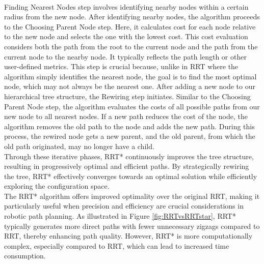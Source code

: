 \documentclass{ctuthesis}
\begin{document}
\\
Finding Nearest Nodes step involves identifying nearby nodes 
within a certain radius from the new node. 
After identifying nearby nodes, the algorithm proceeds to the Choosing Parent Node step. 
Here, it calculates cost for each node 
relative to the new node and selects the one with the lowest cost. 
This cost evaluation considers both the path from the root to the current node and 
the path from the current node to the nearby node. 
It typically reflects the path length or other user-defined metrics. 
This step is crucial because, 
unlike in RRT where the algorithm simply identifies the nearest node, 
the goal is to find the most optimal node,
which may not always be the nearest one. 
After adding a new node to our hierarchical tree structure, 
the Rewiring step initiates. 
Similar to the Choosing Parent Node step, 
the algorithm evaluates the costs of all possible paths from our new node to all nearest nodes. 
If a new path reduces the cost of the node, the algorithm removes the old path to the node
and adds the new path.
During this process, the rewired node gets a new parent, 
and the old parent, from which the old path originated, may no longer have a child.\\[12pt]
Through these iterative phases, RRT* continuously improves the tree structure, 
resulting in progressively optimal and efficient paths. 
By strategically rewiring the tree, 
RRT* effectively converges towards an optimal solution while 
efficiently exploring the configuration space.\\[12pt]
The RRT* algorithm offers improved optimality over the original RRT, 
making it particularly useful when precision and efficiency are crucial 
considerations in robotic path planning.
As illustrated in Figure \ref{fig:RRTvsRRTstar}, 
RRT* typically generates more direct paths with fewer unnecessary zigzags compared to RRT, 
thereby enhancing path quality.
However, RRT* is more computationally complex, especially compared to RRT, 
which can lead to increased time consumption.\\[12pt]
\end{document}
